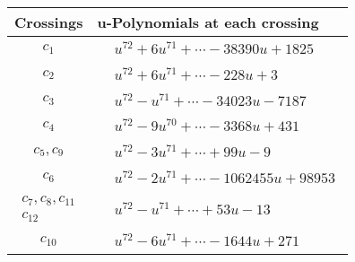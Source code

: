 \documentclass[1p]{elsarticle_modified}
\theoremstyle{definition}
\begin{document}
\begin{tabular}{m{50pt}|m{274pt}}
Crossings & \hspace{64pt}u-Polynomials at each crossing \\
\hline $$\begin{aligned}c_{1}\end{aligned}$$&$\begin{aligned}
&u^{72}+6 u^{71}+\cdots-38390 u+1825
\end{aligned}$\\
\hline $$\begin{aligned}c_{2}\end{aligned}$$&$\begin{aligned}
&u^{72}+6 u^{71}+\cdots-228 u+3
\end{aligned}$\\
\hline $$\begin{aligned}c_{3}\end{aligned}$$&$\begin{aligned}
&u^{72}- u^{71}+\cdots-34023 u-7187
\end{aligned}$\\
\hline $$\begin{aligned}c_{4}\end{aligned}$$&$\begin{aligned}
&u^{72}-9 u^{70}+\cdots-3368 u+431
\end{aligned}$\\
\hline $$\begin{aligned}c_{5},c_{9}\end{aligned}$$&$\begin{aligned}
&u^{72}-3 u^{71}+\cdots+99 u-9
\end{aligned}$\\
\hline $$\begin{aligned}c_{6}\end{aligned}$$&$\begin{aligned}
&u^{72}-2 u^{71}+\cdots-1062455 u+98953
\end{aligned}$\\
\hline $$\begin{aligned}c_{7},c_{8},c_{11}\\c_{12}\end{aligned}$$&$\begin{aligned}
&u^{72}- u^{71}+\cdots+53 u-13
\end{aligned}$\\
\hline $$\begin{aligned}c_{10}\end{aligned}$$&$\begin{aligned}
&u^{72}-6 u^{71}+\cdots-1644 u+271
\end{aligned}$\\
\hline
\end{tabular}\\~\\
\end{document}
